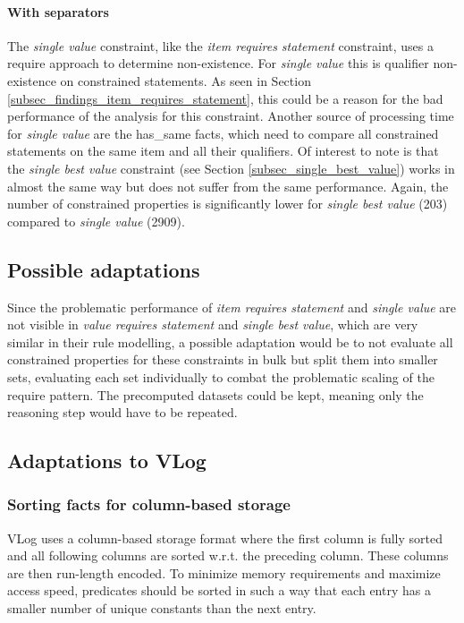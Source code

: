 \documentclass[hyperref,bachelorofscience,fleqn]{cgvpub}
\begin{document}
\paragraph{With separators}
The \emph{single value} constraint, like the \emph{item requires statement} constraint, uses a require approach to determine non-existence. For \emph{single value} this is qualifier non-existence on constrained statements. As seen in Section \ref{subsec_findings_item_requires_statement}, this could be a reason for the bad performance of the analysis for this constraint. Another source of processing time for \emph{single value} are the has\_same facts, which need to compare all constrained statements on the same item and all their qualifiers. Of interest to note is that the \emph{single best value} constraint (see Section \ref{subsec_single_best_value}) works in almost the same way but does not suffer from the same performance. Again, the number of constrained properties is significantly lower for \emph{single best value} (203) compared to \emph{single value} (2909).

\subsection{Possible adaptations}
Since the problematic performance of \emph{item requires statement} and \emph{single value} are not visible in \emph{value requires statement} and \emph{single best value}, which are very similar in their rule modelling, a possible adaptation would be to not evaluate all constrained properties for these constraints in bulk but split them into smaller sets, evaluating each set individually to combat the problematic scaling of the require pattern. The precomputed datasets could be kept, meaning only the reasoning step would have to be repeated.

\subsection{Adaptations to VLog}

\subsubsection{Sorting facts for column-based storage}
VLog uses a column-based storage format where the first column is fully sorted and all following columns are sorted w.r.t. the preceding column. These columns are then run-length encoded. To minimize memory requirements and maximize access speed, predicates should be sorted in such a way that each entry has a smaller number of unique constants than the next entry.
\end{document}
